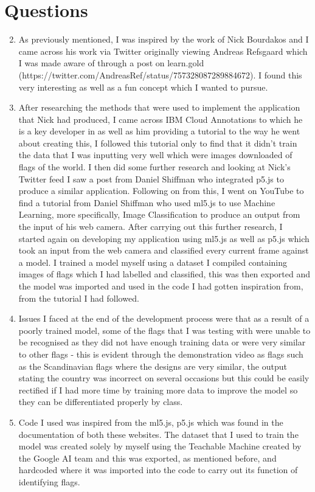 \documentclass{report}
\begin{document}
\section*{Questions}
\begin{enumerate}
	\setcounter{enumi}{1}
	\item As previously mentioned, I was inspired by the work of Nick Bourdakos and I came across his work via Twitter originally viewing Andreas Refsgaard which I was made aware of through a post on learn.gold (https://twitter.com/AndreasRef/status/757328087289884672). I found this very interesting as well as a fun concept which I wanted to pursue.
	\item After researching the methods that were used to implement the application that Nick had produced, I came across IBM Cloud Annotations to which he is a key developer in as well as him providing a tutorial to the way he went about creating this, I followed this tutorial only to find that it didn't train the data that I was inputting very well which were images downloaded of flags of the world. I then did some further research and looking at Nick's Twitter feed I saw a post from Daniel Shiffman who integrated p5.js to produce a similar application. Following on from this, I went on YouTube to find a tutorial from Daniel Shiffman who used ml5.js to use Machine Learning, more specifically, Image Classification to produce an output from the input of his web camera. After carrying out this further research, I started again on developing my application using ml5.js as well as p5.js which took an input from the web camera and classified every current frame against a model. I trained a model myself using a dataset I compiled containing images of flags which I had labelled and classified, this was then exported and the model was imported and used in the code I had gotten inspiration from, from the tutorial I had followed. 
	\item Issues I faced at the end of the development process were that as a result of a poorly trained model, some of the flags that I was testing with were unable to be recognised as they did not have enough training data or were very similar to other flags - this is evident through the demonstration video as flags such as the Scandinavian flags where the designs are very similar, the output stating the country was incorrect on several occasions but this could be easily rectified if I had more time by training more data to improve the model so they can be differentiated properly by class.
	\item Code I used was inspired from the ml5.js, p5.js which was found in the documentation of both these websites. The dataset that I used to train the model was created solely by myself using the Teachable Machine created by the Google AI team and this was exported, as mentioned before, and hardcoded where it was imported into the code to carry out its function of identifying flags.

\end{enumerate}
\end{document}

